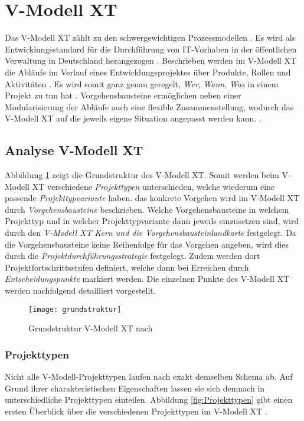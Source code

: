 \section{V-Modell XT}


Das V-Modell XT zählt zu den schwergewichtigen Prozessmodellen \cite{Hanser2010}. Es wird als Entwicklungsstandard für die Durchführung von IT-Vorhaben in der öffentlichen Verwaltung in Deutschland herangezogen \cite{Kuhrmann2011}. Beschrieben werden im V-Modell XT die Abläufe im Verlauf eines Entwicklungsprojektes über Produkte, Rollen und Aktivitäten \cite{Friedrich2008}. Es wird somit ganz genau geregelt, \textit{Wer}, \textit{Wann}, \textit{Was} in einem Projekt zu tun hat \cite{2004vmodell}. Vorgehensbausteine ermöglichen neben einer Modularisierung der Abläufe auch eine flexible Zusammenstellung, wodurch das V-Modell XT auf die jeweils eigene Situation angepasst werden kann. \cite{Friedrich2008,Zoerner2012}. \newline

\subsection{Analyse V-Modell XT}

Abbildung \ref{fig:grundstruktur} zeigt die Grundstruktur des V-Modell XT. Somit werden beim V-Modell XT verschiedene \textit{Projekttypen} unterschieden, welche wiederum eine passende \textit{Projekttypvariante} haben. das konkrete Vorgehen wird im V-Modell XT durch \textit{Vorgehensbausteine} beschrieben. Welche Vorgehensbausteine in welchem Projekttyp und in welcher Projekttypvariante dann jeweils einzusetzen sind, wird durch den \textit{V-Modell XT Kern und die Vorgehensbausteinlandkarte} festgelegt. Da die Vorgehensbausteine keine Reihenfolge für das Vorgehen angeben, wird dies durch die \textit{Projektdurchführungsstrategie} festgelegt. Zudem werden dort Projektfortschrittsstufen definiert, welche dann bei Erreichen durch \textit{Entscheidungspunkte} markiert werden. Die einzelnen Punkte des V-Modell XT werden nachfolgend detailliert vorgestellt.
\begin{figure}[htp]
\begin{center}
  \texttt{[image: grundstruktur]} %
  \caption{Grundstruktur V-Modell XT nach \cite{2004vmodell}}
  \label{fig:grundstruktur}
\end{center}
\end{figure}

\subsubsection{Projekttypen}
Nicht alle V-Modell-Projekttypen laufen nach exakt demselben Schema ab. Auf Grund ihrer charakteristischen Eigenschaften lassen sie sich demnach in unterschiedliche Projekttypen einteilen. Abbildung \ref{fig:Projekttypen} gibt einen ersten Überblick über die verschiedenen Projekttypen im V-Modell XT \cite{2004vmodell}.

